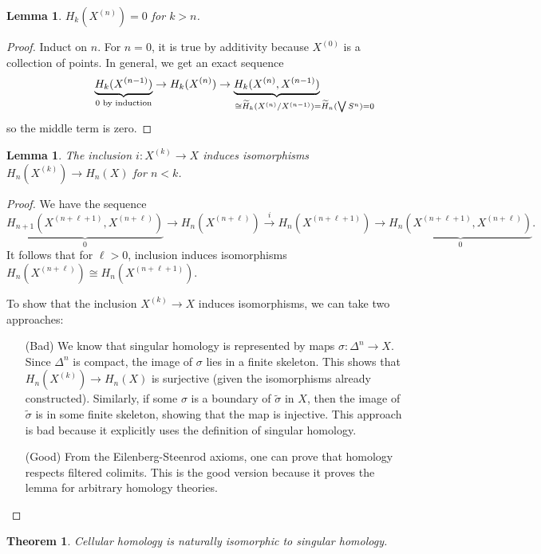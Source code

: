 \documentclass[12pt]{article}
\theoremstyle{plain}
\newtheorem{theorem}[equation]{Theorem}
\newtheorem{lemma}[equation]{Lemma}
\theoremstyle{definition}
\theoremstyle{remark}
\renewcommand{\H}{\widetilde H}
\begin{document}
 \begin{lemma}\label{L:lemm1}
   $H_k(X^{(n)})=0$ for $k>n$.
 \end{lemma}
 \begin{proof}
   Induct on $n$. For $n=0$, it is true by additivity because $X^{(0)}$ is a collection
   of points. In general, we get an exact sequence
   \[
    \underbrace{H_k(X^{(n-1)})}_{0\text{ by induction}} \to H_k(X^{(n)}) \to
    \underbrace{H_k(X^{(n)},X^{(n-1)})}_{\cong \H_k(X^{(n)}/X^{(n-1)}) = \H_n(\bigvee
    S^n)=0 \hspace*{-5em}}
   \]
   so the middle term is zero.
 \end{proof}
 \begin{lemma}\label{L:lemm2}
   The inclusion $i:X^{(k)}\to X$ induces isomorphisms $H_n(X^{(k)})\to H_n(X)$ for $n<
   k$.
 \end{lemma}
 \begin{proof}
   We have the sequence
   \[
    \underbrace{H_{n+1}(X^{(n+\ell+1)},X^{(n+\ell)})}_0 \to H_n(X^{(n+\ell)}) \xrightarrow{i}
    H_n(X^{(n+\ell+1)}) \to \underbrace{H_n(X^{(n+\ell+1)},X^{(n+\ell)})}_0 .
   \]
   It follows that for $\ell>0$, inclusion induces isomorphisms $H_n(X^{(n+\ell)})\cong
   H_n(X^{(n+\ell+1)})$.

   To show that the inclusion $X^{(k)}\to X$ induces isomorphisms, we can take two
   approaches:
   \begin{enumerate}
     \item[(Bad)] We know that singular homology is represented by maps
     $\sigma:\Delta^n\to X$. Since $\Delta^n$ is compact, the image of $\sigma$ lies in a
     finite skeleton. This shows that $H_n(X^{(k)})\to H_n(X)$ is surjective (given the
     isomorphisms already constructed). Similarly, if some $\sigma$ is a boundary of
     $\tilde\sigma$ in $X$, then the image of $\tilde\sigma$ is in some finite skeleton,
     showing that the map is injective. This approach is bad because it explicitly uses
     the definition of singular homology.

     \item[(Good)] From the Eilenberg-Steenrod axioms, one can prove that homology
     respects filtered colimits. This is the good version because it proves the lemma for
     arbitrary homology theories.\qedhere
   \end{enumerate}
 \end{proof}
 \begin{theorem}
   Cellular homology is naturally isomorphic to singular homology.
 \end{theorem}
\end{document}
